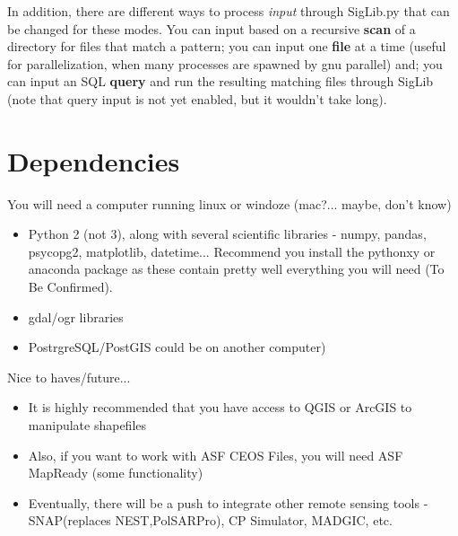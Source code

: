 \documentclass[letterpaper,10pt,english]{sphinxmanual}
\begin{document}
In addition, there are different ways to process \emph{input} through
SigLib.py that can be changed for these modes. You can input based on a
recursive \textbf{scan} of a directory for files that match a pattern; you
can input one \textbf{file} at a time (useful for parallelization, when many
processes are spawned by gnu parallel) and; you can input an SQL
\textbf{query} and run the resulting matching files through SigLib (note that
query input is not yet enabled, but it wouldn't take long).


\section{Dependencies}
\label{intro:dependencies}
You will need a computer running linux or windoze (mac?... maybe, don't
know)
\begin{itemize}
\item {} 
Python 2 (not 3), along with several scientific libraries - numpy,
pandas, psycopg2, matplotlib, datetime... Recommend you install the
pythonxy or anaconda package as these contain pretty well everything
you will need (To Be Confirmed).

\item {} 
gdal/ogr libraries

\item {} 
PostrgreSQL/PostGIS could be on another computer)

\end{itemize}

Nice to haves/future...
\begin{itemize}
\item {} 
It is highly recommended that you have access to QGIS or ArcGIS to
manipulate shapefiles

\item {} 
Also, if you want to work with ASF CEOS Files, you will need ASF
MapReady (some functionality)

\item {} 
Eventually, there will be a push to integrate other remote sensing
tools - SNAP(replaces NEST,PolSARPro), CP Simulator, MADGIC, etc.

\end{itemize}
\end{document}
